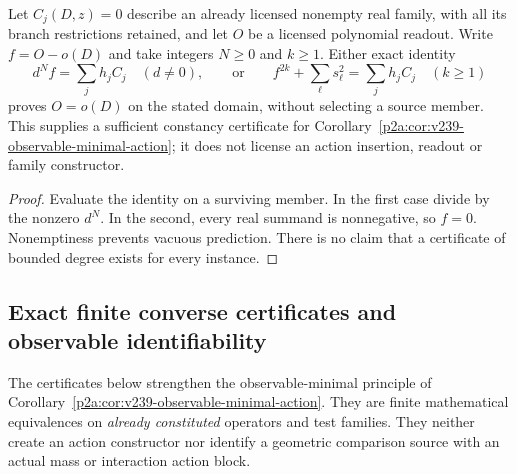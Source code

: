 \documentclass[12pt,a4paper]{article}
\begin{document}
\begin{proposition}
\label{p2a:prop:v257-observable-certificates}
Let $C_j(D,z)=0$ describe an already licensed nonempty real family, with
all its branch restrictions retained, and let $O$ be a licensed polynomial
readout. Write $f=O-o(D)$ and take integers $N\ge0$ and $k\ge1$.
Either exact identity
\[
 d^Nf=\sum_jh_jC_j\quad(d\ne0),\qquad\text{or}\qquad
 f^{2k}+\sum_\ell s_\ell^2=\sum_jh_jC_j\quad(k\ge1)
\]
proves $O=o(D)$ on the stated domain, without selecting a source member.
This supplies a sufficient constancy certificate for
Corollary~\ref{p2a:cor:v239-observable-minimal-action}; it does not
license an action insertion, readout or family constructor.
\end{proposition}
\begin{proof}
Evaluate the identity on a surviving member. In the first case divide
by the nonzero $d^N$. In the second, every real summand is nonnegative,
so $f=0$. Nonemptiness prevents vacuous prediction. There is no claim
that a certificate of bounded degree exists for every instance.
\end{proof}


\subsection{Exact finite converse certificates and observable identifiability}
\label{p2a:sec:v267-exact-converse-observables}
The certificates below strengthen the observable-minimal principle of
Corollary~\ref{p2a:cor:v239-observable-minimal-action}.  They are finite
mathematical equivalences on \emph{already constituted} operators and test
families.  They neither create an action constructor nor identify a geometric
comparison source with an actual mass or interaction action block.
\end{document}
